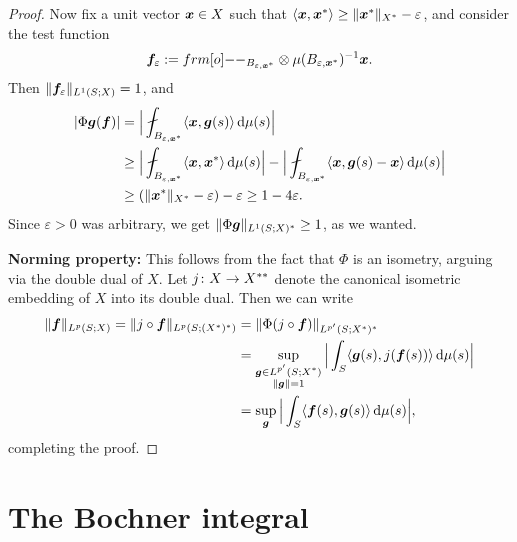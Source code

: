 \begin{proof}
  Now fix a unit vector $\bm{x} \in X$ such that $\langle \bm{x}, \bm{x}^* \rangle \geq \|\bm{x}^*\|_{X^*} - \varepsilon$, and consider the test function
  \begin{equation*}
    \mb{f}_{\varepsilon} := \1_{B_{\varepsilon, \mb{x}^*}} \otimes \mu(B_{\varepsilon, \mb{x}^*})^{-1} \mb{x}.
  \end{equation*}
  Then $\|\bm{f}_{\varepsilon}\|_{L^1(S;X)} = 1$, and
  \begin{equation*}
    \begin{aligned}
      |\Phi \mb{g}(\mb{f})| &=  \Big| \fint_{B_{\varepsilon, \mb{x}^*}} \langle \mb{x}, \mb{g}(s) \rangle \, \dd\mu(s) \Big| \\
      &\geq \Big| \fint_{B_{\varepsilon, \mb{x}^*}} \langle \mb{x}, \mb{x}^* \rangle \, \dd\mu(s) \Big| - \Big| \fint_{B_{\varepsilon, \mb{x}^*}} \langle \mb{x}, \mb{g}(s) - \mb{x} \rangle  \, \dd\mu(s) \Big| \\
      &\geq (\|\mb{x}^*\|_{X^*} - \varepsilon) - \varepsilon \geq 1 - 4\varepsilon.
    \end{aligned}
  \end{equation*}
  Since $\varepsilon > 0$ was arbitrary, we get $\|\Phi \bm{g}\|_{L^1(S;X)^*} \geq 1$, as we wanted.

  \textbf{Norming property:}
  This follows from the fact that $\Phi$ is an isometry, arguing via the double dual of $X$.
  Let $j \colon X \rightarrow X^{**}$ denote the canonical isometric embedding of $X$ into its double dual.
  Then we can write
  \begin{equation*}
    \begin{aligned}
      \|\bm{f}\|_{L^p(S;X)} = \|j \circ \bm{f}\|_{L^p(S;(X^*)^*)} &= \|\Phi (j \circ \bm{f})\|_{L^{p'}(S; X^*)^*} \\
      &=  \sup_{\substack{\bm{g} \in L^{p'}(S;X^*) \\ \|\bm{g}\| = 1}} \Big| \int_{S} \langle \bm{g}(s) , j(\bm{f}(s)) \rangle \, \mathrm{d}\mu(s) \Big| \\
      &= \sup_{\bm{g}} \Big| \int_{S} \langle \bm{f}(s) , \bm{g}(s) \rangle \, \mathrm{d}\mu(s) \Big|,
    \end{aligned}
  \end{equation*}
  completing the proof.
\end{proof}

\section{The Bochner integral}

